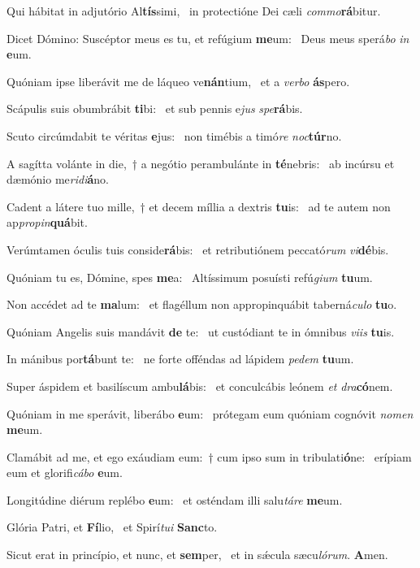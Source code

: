 \item Qui hábitat in adjutório Al\textbf{tís}simi,~\psstar{} in protectióne Dei cæli \textit{commo}\textbf{rá}bitur.
\item Dicet Dómino: Suscéptor meus es tu, et refúgium \textbf{me}um:~\psstar{} Deus meus sperá\textit{bo} \textit{in} \textbf{e}um.
\item Quóniam ipse liberávit me de láqueo ve\textbf{nán}tium,~\psstar{} et a \textit{verbo} \textbf{ás}pero.
\item Scápulis suis obumbrábit \textbf{ti}bi:~\psstar{} et sub pennis e\textit{jus} \textit{spe}\textbf{rá}bis.
\item Scuto circúmdabit te véritas \textbf{e}jus:~\psstar{} non timébis a timó\textit{re} \textit{noc}\textbf{túr}no.
\item A sagítta volánte in die,~† a negótio perambulánte in \textbf{té}nebris:~\psstar{} ab incúrsu et dæmónio me\textit{ridi}\textbf{á}no.
\item Cadent a látere tuo mille,~† et decem míllia a dextris \textbf{tu}is:~\psstar{} ad te autem non ap\textit{propin}\textbf{quá}bit.
\item Verúmtamen óculis tuis conside\textbf{rá}bis:~\psstar{} et retributiónem peccató\textit{rum} \textit{vi}\textbf{dé}bis.
\item Quóniam tu es, Dómine, spes \textbf{me}a:~\psstar{} Altíssimum posuísti refú\textit{gium} \textbf{tu}um.
\item Non accédet ad te \textbf{ma}lum:~\psstar{} et flagéllum non appropinquábit taberná\textit{culo} \textbf{tu}o.
\item Quóniam Angelis suis mandávit \textbf{de} te:~\psstar{} ut custódiant te in ómnibus \textit{viis} \textbf{tu}is.
\item In mánibus por\textbf{tá}bunt te:~\psstar{} ne forte offéndas ad lápidem \textit{pedem} \textbf{tu}um.
\item Super áspidem et basilíscum ambu\textbf{lá}bis:~\psstar{} et conculcábis leónem \textit{et} \textit{dra}\textbf{có}nem.
\item Quóniam in me sperávit, liberábo \textbf{e}um:~\psstar{} prótegam eum quóniam cognóvit \textit{nomen} \textbf{me}um.
\item Clamábit ad me, et ego exáudiam eum:~† cum ipso sum in tribulati\textbf{ó}ne:~\psstar{} erípiam eum et glorifi\textit{cábo} \textbf{e}um.
\item Longitúdine diérum replébo \textbf{e}um:~\psstar{} et osténdam illi salu\textit{táre} \textbf{me}um.
\item Glória Patri, et \textbf{Fí}lio,~\psstar{} et Spirí\textit{tui} \textbf{Sanc}to.
\item Sicut erat in princípio, et nunc, et \textbf{sem}per,~\psstar{} et in sǽcula sæcu\textit{lórum}. \textbf{A}men.
